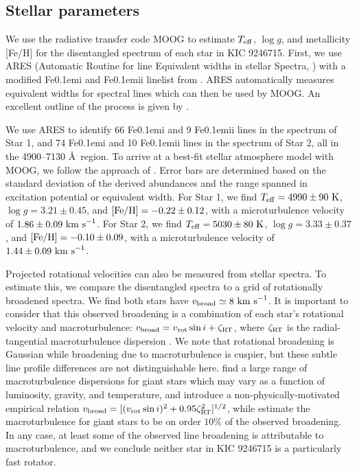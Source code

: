 \subsection{Stellar parameters}\label{parameters}
We use the radiative transfer code MOOG \citep{sne73} to estimate $T_{\rm{eff}}$, $\log g$, and metallicity [Fe/H] for the disentangled spectrum of each star in KIC 9246715. First, we use ARES (Automatic Routine for line Equivalent widths in stellar Spectra, \citealt{Sousa_2007}) with a modified {\rm Fe}\kern 0.1em{\sc i} and {\rm Fe}\kern 0.1em{\sc ii} linelist from \citet{tsa13}. ARES automatically measures equivalent widths for spectral lines which can then be used by MOOG. An excellent outline of the process is given by \citet{Sousa_2014}.

We use ARES to identify 66 {\rm Fe}\kern 0.1em{\sc i} and 9 {\rm Fe}\kern 0.1em{\sc ii} lines in the spectrum of Star 1, and 74 {\rm Fe}\kern 0.1em{\sc i} and 10 {\rm Fe}\kern 0.1em{\sc ii} lines in the spectrum of Star 2, all in the 4900--7130 \AA \ region. To arrive at a best-fit stellar atmosphere model with MOOG, we follow the approach of \citet{mag13}. Error bars are determined based on the standard deviation of the derived abundances and the range spanned in excitation potential or equivalent width. For Star 1, we find $T_{\rm{eff}} = 4990 \pm 90 \ \rm{K}$, $\log g = 3.21 \pm 0.45$, and $\rm{[Fe/H]} = -0.22 \pm 0.12$, with a microturbulence velocity of $1.86 \pm 0.09 \ \rm{km \ s}^{-1}$. For Star 2, we find $T_{\rm{eff}} = 5030 \pm 80 \ \rm{K}$, $\log g = 3.33 \pm 0.37$, and $\rm{[Fe/H]} = -0.10 \pm 0.09$, with a microturbulence velocity of $1.44 \pm 0.09 \ \rm{km \ s}^{-1}$.

Projected rotational velocities can also be measured from stellar spectra. To estimate this, we compare the disentangled spectra to a grid of rotationally broadened spectra. We find both stars have $v_{\rm{broad}} \simeq 8 \ \rm{km \ s}^{-1}$. It is important to consider that this observed broadening is a combination of each star's rotational velocity and macroturbulence: $v_{\rm{broad}} = v_{\rm{rot}} \sin i + \zeta_{\rm{RT}}$, where $\zeta_{\rm{RT}}$ is the radial-tangential macroturbulence dispersion \citep{gra78}. We note that rotational broadening is Gaussian while broadening due to macroturbulence is cuspier, but these subtle line profile differences are not distinguishable here. \citet{car08} find a large range of macroturbulence dispersions for giant stars which may vary as a function of luminosity, gravity, and temperature, and introduce a non-physically-motivated empirical relation $v_{\rm{broad}} = [(v_{\rm{rot}} \sin i)^2 + 0.95\zeta_{\rm{RT}}^2]^{1/2}$, while \citet{tay15} estimate the macroturbulence for giant stars to be on order $10 \%$ of the observed broadening. In any case, at least some of the observed line broadening is attributable to macroturbulence, and we conclude neither star in KIC 9246715 is a particularly fast rotator.
